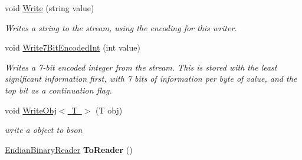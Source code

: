 \begin{DoxyCompactItemize}
\item 
void \mbox{\hyperlink{class_t_net_1_1_i_o_1_1_endian_binary_writer_a457b0c305afc6ba5d1fccec7c5904ef3}{Write}} (string value)
\begin{DoxyCompactList}\small\item\em Writes a string to the stream, using the encoding for this writer. \end{DoxyCompactList}\item 
void \mbox{\hyperlink{class_t_net_1_1_i_o_1_1_endian_binary_writer_aa472b542d540fc5d4cf03003f475c718}{Write7\+Bit\+Encoded\+Int}} (int value)
\begin{DoxyCompactList}\small\item\em Writes a 7-\/bit encoded integer from the stream. This is stored with the least significant information first, with 7 bits of information per byte of value, and the top bit as a continuation flag. \end{DoxyCompactList}\item 
void \mbox{\hyperlink{class_t_net_1_1_i_o_1_1_endian_binary_writer_aa95805d0a303250d0607c54baee77e96}{Write\+Obj$<$ T $>$}} (T obj)
\begin{DoxyCompactList}\small\item\em write a object to bson \end{DoxyCompactList}\item 
\mbox{\label{class_t_net_1_1_i_o_1_1_endian_binary_writer_aacec393d39a3f2df0286c9b6590832b3}} 
\mbox{\hyperlink{class_t_net_1_1_i_o_1_1_endian_binary_reader}{Endian\+Binary\+Reader}} {\bfseries To\+Reader} ()
\end{DoxyCompactItemize}
